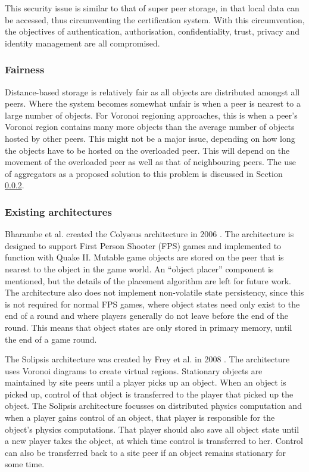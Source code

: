This security issue is similar to that of super peer storage, in that local data can be accessed, thus circumventing the certification system. With this circumvention, the objectives of authentication, authorisation, confidentiality, trust, privacy and identity management are all compromised.

\subsubsection{Fairness}

Distance-based storage is relatively fair as all objects are distributed amongst all peers. Where the system becomes somewhat unfair is when a peer is nearest to a large number of objects. For Voronoi regioning approaches, this is when a peer's Voronoi region contains many more objects than the average number of objects hosted by other peers. This might not be a major issue, depending on how long the objects have to be hosted on the overloaded peer. This will depend on the movement of the overloaded peer as well as that of neighbouring peers. The use of aggregators as a proposed solution to this problem is discussed in Section \ref{distance_based_existing_archs}.

\subsubsection{Existing architectures}
\label{distance_based_existing_archs}

Bharambe et al. created the Colyseus architecture in 2006 \cite{colyseus_distance_based}. The architecture is designed to support First Person Shooter (FPS) games and implemented to function with Quake II. Mutable game objects are stored on the peer that is nearest to the object in the game world. An ``object placer'' component is mentioned, but the details of the placement algorithm are left for future work. The architecture also does not implement non-volatile state persistency, since this is not required for normal FPS games, where object states need only exist to the end of a
round and where players generally do not leave before the end of the round. This means that object states are only stored in primary memory, until the end of a game round.

The Solipsis architecture was created by Frey et al. in 2008 \cite{solipsis}. The architecture uses Voronoi diagrams to create virtual regions. Stationary objects are maintained by site peers until a player picks up an object. When an object is picked up, control of that object is transferred to the player that picked up the object. The Solipsis architecture focusses on distributed physics computation and when a player gains control of an object, that player is responsible for the object's physics computations. That player should also save all object state until a new player takes the object, at which time control is transferred to her. Control can also be transferred back to a site peer if an object remains stationary for some
time.

